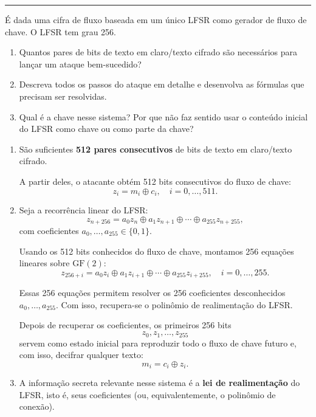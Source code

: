 \documentclass[12pt,a4paper]{article}
\newcommand{\exercicio}[1]{%
    \par\vspace{1.2em}
    \noindent
    {\color{black!55}\rule[-0.25em]{3pt}{1.6em}}%
    \hspace{0.6em}{\Large\bfseries Exerc\'{i}cio #1}
    \par\vspace{-0.4em}
    \noindent{\color{black!35}\rule{\textwidth}{0.4pt}}
    \par\vspace{0.35em}
}
\newenvironment{resposta}{%
    \begin{respostabox}
    \color{red!70!black}\sloppy
}{%
    \end{respostabox}
}
\begin{document}
\exercicio{8}
É dada uma cifra de fluxo baseada em um único LFSR como gerador de fluxo de chave. O LFSR tem grau 256.

\begin{enumerate}[label=\arabic*.]
    \item Quantos pares de bits de texto em claro/texto cifrado são necessários para lançar um ataque bem-sucedido?
    \item Descreva todos os passos do ataque em detalhe e desenvolva as fórmulas que precisam ser resolvidas.
    \item Qual é a chave nesse sistema? Por que não faz sentido usar o conteúdo inicial do LFSR como chave ou como parte da chave?
\end{enumerate}

\begin{resposta}

\begin{enumerate}[label=\arabic*.]
    \item São suficientes \textbf{512 pares consecutivos} de bits de texto em claro/texto cifrado.

    A partir deles, o atacante obtém 512 bits consecutivos do fluxo de chave:
    \[
    z_i = m_i \oplus c_i, \quad i=0,\ldots,511.
    \]

    \item Seja a recorrência linear do LFSR:
    \[
    z_{n+256} = a_0 z_n \oplus a_1 z_{n+1} \oplus \cdots \oplus a_{255} z_{n+255},
    \]
    com coeficientes $a_0,\ldots,a_{255} \in \{0,1\}$.

    Usando os 512 bits conhecidos do fluxo de chave, montamos 256 equações lineares sobre $\mathrm{GF}(2)$:
    \[
    z_{256+i} = a_0 z_i \oplus a_1 z_{i+1} \oplus \cdots \oplus a_{255} z_{i+255},
    \quad i=0,\ldots,255.
    \]

    Essas 256 equações permitem resolver os 256 coeficientes desconhecidos
    $a_0,\ldots,a_{255}$.
    Com isso, recupera-se o polinômio de realimentação do LFSR.

    Depois de recuperar os coeficientes, os primeiros 256 bits
    \[
    z_0,z_1,\ldots,z_{255}
    \]
    servem como estado inicial para reproduzir todo o fluxo de chave futuro e, com isso, decifrar qualquer texto:
    \[
    m_i = c_i \oplus z_i.
    \]

    \item A informação secreta relevante nesse sistema é a \textbf{lei de realimentação} do LFSR, isto é, seus coeficientes (ou, equivalentemente, o polinômio de conexão).


\end{enumerate}
\end{resposta}
\end{document}
